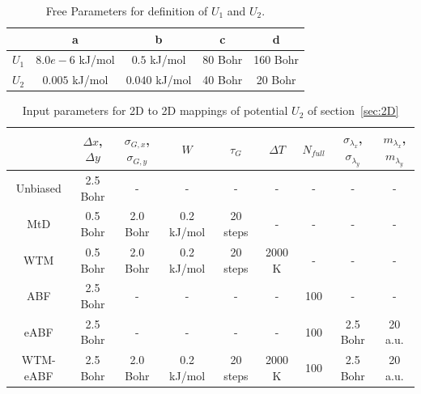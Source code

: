 \begin{table}[H]
      \centering
         \caption{Free Parameters for definition of $U_1$ and $U_2$.}
         \begin{tabular}{ c | c  c  c  c }
                 & a & b & c & d   \\
                 \hline
                 $U_1$  & $8.0e-6$ kJ/mol & $0.5$ kJ/mol & 80 Bohr & 160 Bohr \\
                 $U_2$  & $0.005$ kJ/mol  & $0.040$ kJ/mol & 40 Bohr & 20 Bohr \\
      \end{tabular}
      \label{tab:2D pots}
\end{table}
\begin{table}[H]
      \centering
         \caption{Input parameters for 2D to 2D mappings of potential $U_2$ of section~\ref{sec:2D}}
         \begin{tabular}{ c | c  c  c  c  c c c c}
                 & $\Delta x$,$\Delta y$ & $\sigma_{G,x}$,$\sigma_{G,y}$ & $W$ & $\tau_G$ & $\Delta T$ & $N_{full}$ & $\sigma_{\lambda_{x}}$,$\sigma_{\lambda_y}$ & $m_{\lambda_x}$,$m_{\lambda_y}$   \\
                 \hline
            Unbiased & 2.5 Bohr & - & - & - & - & - & - & - \\
            MtD      & 0.5 Bohr & 2.0 Bohr & 0.2 kJ/mol & 20 steps & - & - & - & - \\
            WTM      & 0.5 Bohr & 2.0 Bohr & 0.2 kJ/mol & 20 steps & 2000 K & - & - & - \\
            ABF      & 2.5 Bohr &  -       & -          & -        & -      & 100 & - & - \\
            eABF     & 2.5 Bohr &  -       & -          & -        & -      & 100 & 2.5 Bohr & 20 a.u. \\
            WTM-eABF & 2.5 Bohr & 2.0 Bohr & 0.2 kJ/mol & 20 steps & 2000 K & 100 & 2.5 Bohr & 20 a.u. \\
      \end{tabular}
      \label{tab:2D params}
\end{table}
